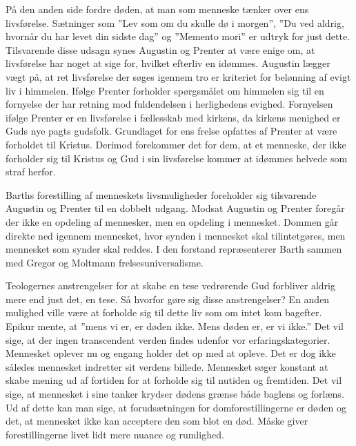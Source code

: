 På den anden side fordre døden, at man som menneske tænker over ens livsførelse. Sætninger som ”Lev som om du skulle dø i morgen”, ”Du ved aldrig, hvornår du har levet din sidste dag” og ”Memento mori” er udtryk for just dette. Tilsvarende disse udsagn synes Augustin og Prenter at være enige om, at livsførelse har noget at sige for, hvilket efterliv en idømmes. Augustin lægger vægt på, at ret livsførelse der søges igennem tro er kriteriet for belønning af evigt liv i himmelen. Ifølge Prenter forholder spørgsmålet om himmelen sig til en fornyelse der har retning mod fuldendelsen i herlighedens evighed. Fornyelsen ifølge Prenter er en livsførelse i fællesskab med kirkens, da kirkens menighed er Guds nye pagts gudsfolk. Grundlaget for ens frelse opfattes af Prenter at være forholdet til Kristus. Derimod forekommer det for dem, at et menneske, der ikke forholder sig til Kristus og Gud i sin livsførelse kommer at idømmes helvede som straf herfor.

Barths forestilling af menneskets livsmuligheder foreholder sig tilsvarende Augustin og Prenter til en dobbelt udgang. Modsat Augustin og Prenter foregår der ikke en opdeling af mennesker, men en opdeling i mennesket. Dommen går direkte ned igennem mennesket, hvor synden i mennesket skal tilintetgøres, men mennesket som synder skal reddes. I den forstand repræsenterer Barth sammen med Gregor og Moltmann frelsesuniversalisme.

Teologernes anstrengelser for at skabe en tese vedrørende Gud forbliver aldrig mere end just det, en tese. Så hvorfor gøre sig disse anstrengelser? En anden mulighed ville være at forholde sig til dette liv som om intet kom bagefter. Epikur mente, at ”mens vi er, er døden ikke. Mens døden er, er vi ikke.” Det vil sige, at der ingen transcendent verden findes udenfor vor erfaringskategorier. Mennesket oplever nu og engang holder det op med at opleve. Det er dog ikke således mennesket indretter sit verdens billede. Mennesket søger konstant at skabe mening ud af fortiden for at forholde sig til nutiden og fremtiden. Det vil sige, at mennesket i sine tanker krydser dødens grænse både baglens og forlæns. Ud af dette kan man sige, at forudsætningen for domforestillingerne er døden og det, at mennesket ikke kan acceptere den som blot en død. Måske giver forestillingerne livet lidt mere nuance og rumlighed.  
